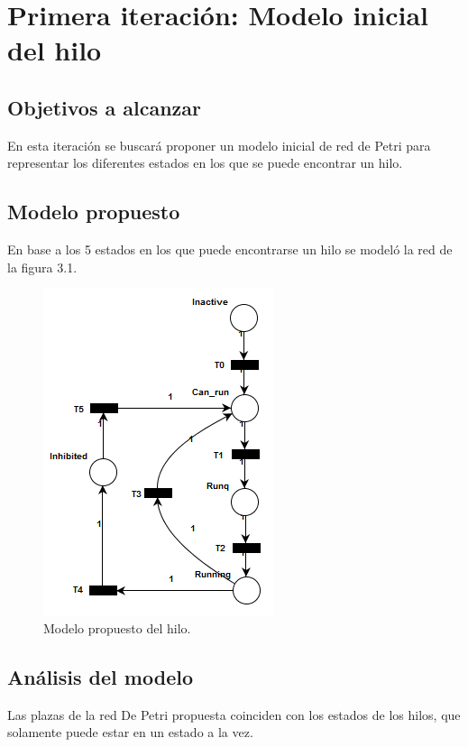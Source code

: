 \documentclass[a4paper]{book}
\begin{document}
\newpage
\section{Primera iteraci\'on: Modelo inicial del hilo}

\subsection{Objetivos a alcanzar}
En esta iteraci\'on se buscar\'a proponer un modelo inicial de red de Petri para representar los diferentes estados en los que se puede encontrar un hilo.

\subsection{Modelo propuesto}
En base a los 5 estados en los que puede encontrarse un hilo se model\'o la red de la figura 3.1.

\begin{figure} [H]
	\begin{center}
	    \includegraphics[scale=1]{./imagenes/it1modelohilo.png}
		\caption{Modelo propuesto del hilo.}
	\end{center}
\end{figure}

\subsection{An\'alisis del modelo}
Las plazas de la red De Petri propuesta coinciden con los estados de los hilos, que solamente puede estar en un estado a la vez.\\
\end{document}
